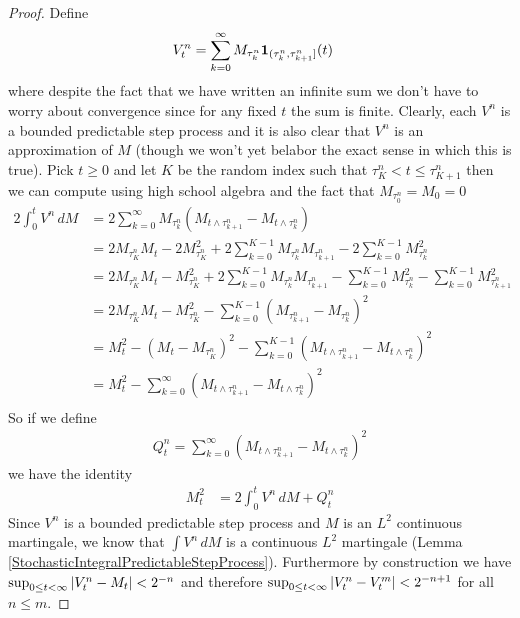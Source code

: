 \begin{proof}
Define 
\begin{align*}
V^n_t &= \sum_{k=0}^\infty M_{\tau^n_{k}} \textbf{1}_{(\tau^n_{k}, \tau^n_{k+1}]}(t)
\end{align*}
where despite the fact that we have written an infinite sum we don't have to worry about convergence since for any fixed $t$ the sum is finite.  Clearly, each $V^n$ is a bounded predictable step process and it is also clear that $V^n$ is an approximation of $M$ (though we won't yet belabor the exact sense in which this is true).  Pick $t \geq 0$ and let $K$ be the random index such that $\tau^n_{K} < t \leq \tau^n_{K+1}$ then we can compute using high school algebra and the fact that $M_{\tau^n_0} = M_0 = 0$
\begin{align*}
2 \int_0^t V^n \, dM &= 2 \sum_{k=0}^\infty M_{\tau^n_{k}} \left ( M_{t \wedge \tau^n_{k+1}} - M_{t \wedge \tau^n_k} \right ) \\
&=2 M_{\tau^n_K} M_t - 2 M_{\tau^n_K}^2 + 2 \sum_{k=0}^{K-1} M_{\tau^n_k} M_{\tau^n_{k+1}} - 2 \sum_{k=0}^{K-1} M^2_{\tau^n_k} \\
&=2 M_{\tau^n_K} M_t -  M_{\tau^n_K}^2 + 2 \sum_{k=0}^{K-1} M_{\tau^n_k} M_{\tau^n_{k+1}} - \sum_{k=0}^{K-1} M^2_{\tau^n_k}  - \sum_{k=0}^{K-1} M^2_{\tau^n_{k+1}} \\
&=2 M_{\tau^n_K} M_t -  M_{\tau^n_K}^2 - \sum_{k=0}^{K-1} \left (M_{\tau^n_{k+1}}  - M_{\tau^n_k}\right)^2 \\
&=M_t^2 - \left( M_t - M_{\tau^n_K} \right)^2 - \sum_{k=0}^{K-1} \left (M_{t \wedge \tau^n_{k+1}}  - M_{t \wedge \tau^n_k}\right)^2 \\
&=M_t^2 - \sum_{k=0}^\infty \left (M_{t \wedge \tau^n_{k+1}}  - M_{t \wedge \tau^n_k}\right)^2 \\
\end{align*}
So if we define 
\begin{align*}
Q^n_t = \sum_{k=0}^\infty \left (M_{t \wedge \tau^n_{k+1}}  - M_{t \wedge \tau^n_k}\right)^2 
\end{align*}
we have the identity
\begin{align*}
M^2_t &= 2 \int_0^t V^n \, dM + Q^n_t
\end{align*}
Since $V^n$ is a bounded predictable step process and $M$ is an $L^2$ continuous martingale, we know that $\int V^n \, dM$ is a continuous $L^2$ martingale (Lemma \ref{StochasticIntegralPredictableStepProcess}).   Furthermore by construction we have $\sup_{0 \leq t < \infty} \left \vert V^n_t - M_t \right \vert < 2^{-n}$ and therefore $\sup_{0 \leq t < \infty} \left \vert V^n_t - V^m_t \right \vert < 2^{-n+1}$ for all $n \leq m$.  

\end{proof}
